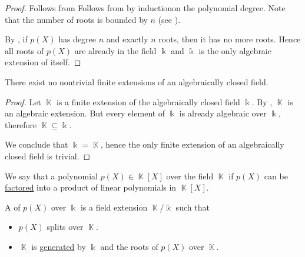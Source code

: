 \begin{proof}
   Follows from  Follows from  by induction\IND on the polynomial degree. Note that the number of roots is bounded by \( n \) (see ).

   By , if \( p(X) \) has degree \( n \) and exactly \( n \) roots, then it has no more roots. Hence all roots of \( p(X) \) are already in the field \( \Bbbk \) and \( \Bbbk \) is the only algebraic extension of itself.
\end{proof}

\begin{proposition}\label{thm:no_finite_extensions_of_closed_fields}
  There exist no nontrivial finite extensions of an algebraically closed field.
\end{proposition}
\begin{proof}
  Let \( \BbbK \) is a finite extension of the algebraically closed field \( \Bbbk \). By , \( \BbbK \) is an algebraic extension. But every element of \( \Bbbk \) is already algebraic over \( \Bbbk \), therefore \( \BbbK \subseteq \Bbbk \).

  We conclude that \( \Bbbk = \BbbK \), hence the only finite extension of an algebraically closed field is trivial.
\end{proof}

\begin{definition}\label{def:splitting_field}\mcite\cite[458]{Knapp2016BasicAlgebra}
  We say that a polynomial \( p(X) \in \BbbK[X] \) over the field \( \BbbK \)  if \( p(X) \) can be \hyperref[def:factorization_in_ring]{factored} into a product of linear polynomials in \( \BbbK[X] \).

  A  of \( p(X) \) over \( \Bbbk \) is a field extension \( \BbbK / \Bbbk \) such that
  \begin{itemize}
    \item \( p(X) \) splits over \( \BbbK \).
    \item \( \BbbK \) is \hyperref[def:generated_ring_ideal]{generated} by \( \Bbbk \) and the roots of \( p(X) \) over \( \BbbK \).
  \end{itemize}
\end{definition}

